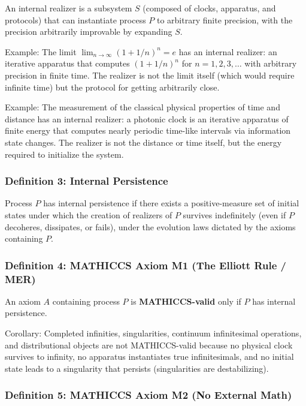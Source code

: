 \documentclass[11pt,a4paper]{article}
\begin{document}
An internal realizer is a subsystem $S$ (composed of clocks, apparatus, and protocols) that can instantiate process $P$ to arbitrary finite precision, with the precision arbitrarily improvable by expanding $S$.

Example: The limit $\lim_{n \to \infty} (1 + 1/n)^n = e$ has an internal realizer: an iterative apparatus that computes $(1 + 1/n)^n$ for $n = 1, 2, 3, \ldots$ with arbitrary precision in finite time. The realizer is not the limit itself (which would require infinite time) but the protocol for getting arbitrarily close.

Example: The measurement of the classical physical properties of time and distance has an internal realizer: a photonic clock is an iterative apparatus of finite energy that computes nearly periodic time-like intervals via information state changes. The realizer is not the distance or time itself, but the energy required to initialize the system. 

\subsubsection{Definition 3: Internal Persistence}

Process $P$ has internal persistence if there exists a positive-measure set of initial states under which the creation of realizers of $P$ survives indefinitely (even if $P$ decoheres, dissipates, or fails), under the evolution laws dictated by the axioms containing $P$.

\subsubsection{Definition 4: MATHICCS Axiom M1 (The Elliott Rule / MER)}

An axiom $A$ containing process $P$ is \textbf{MATHICCS-valid} only if $P$ has internal persistence.

Corollary: Completed infinities, singularities, continuum infinitesimal operations, and distributional objects are not MATHICCS-valid because no physical clock survives to infinity, no apparatus instantiates true infinitesimals, and no initial state leads to a singularity that persists (singularities are destabilizing).

\subsubsection{Definition 5: MATHICCS Axiom M2 (No External Math)}
\end{document}
